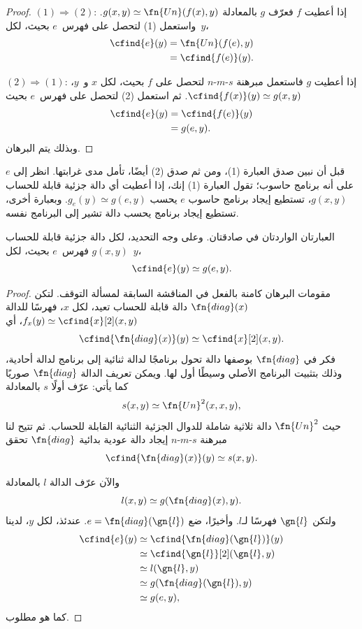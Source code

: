 \documentclass[../../../include/open-logic-section]{subfiles}
\begin{document}
\begin{proof}
$(1) \Rightarrow (2)$: إذا أعطيت $f$ فعرّف $g$ بالمعادلة
$g(x,y) \simeq \fn{Un}(f(x),y)$. واستعمل (1) لتحصل على فهرس~$e$
بحيث، لكل~$y$،
\begin{align*}
\cfind{e}(y) & = \fn{Un}(f(e),y) \\
& = \cfind{f(e)}(y).
\end{align*}

$(2) \Rightarrow (1)$: إذا أعطيت $g$ فاستعمل مبرهنة $s$-$m$-$n$
لتحصل على $f$ بحيث، لكل $x$ و~$y$،
$\cfind{f(x)}(y) \simeq g(x,y)$. ثم استعمل (2) لتحصل على فهرس~$e$
بحيث
\begin{align*}
\cfind{e}(y) & = \cfind{f(e)}(y) \\
& = g(e,y).
\end{align*}
وبذلك يتم البرهان.
\end{proof}

\begin{explain}
قبل أن نبين صدق العبارة (1)، ومن ثم صدق (2) أيضًا، تأمل مدى غرابتها.
انظر إلى $e$ على أنه برنامج حاسوب؛ تقول العبارة (1) إنك، إذا أعطيت
أي دالة جزئية قابلة للحساب $g(x,y)$، تستطيع إيجاد برنامج حاسوب $e$
يحسب $g_e(y) \simeq g(e,y)$. وبعبارة أخرى، تستطيع إيجاد برنامج يحسب
دالة تشير إلى البرنامج نفسه.
\end{explain}

\begin{thm}
العبارتان الواردتان في  صادقتان. وعلى وجه
التحديد، لكل دالة جزئية قابلة للحساب $g(x,y)$ فهرس~$e$ بحيث،
لكل~$y$،
\[
\cfind{e}(y) \simeq g(e,y).
\]
\end{thm}

\begin{proof}
مقومات البرهان كامنة بالفعل في المناقشة السابقة لمسألة التوقف. لتكن
$\fn{diag}(x)$ دالة قابلة للحساب تعيد، لكل $x$، فهرسًا للدالة
$f_x(y) \simeq \cfind{x}[2](x,y)$، أي
\[
\cfind{\fn{diag}(x)}(y) \simeq \cfind{x}[2](x,y).
\]
فكر في $\fn{diag}$ بوصفها دالة تحول برنامجًا لدالة ثنائية إلى برنامج
لدالة أحادية، وذلك بتثبيت البرنامج الأصلي وسيطًا أول لها. ويمكن تعريف
الدالة $\fn{diag}$ صوريًا كما يأتي: عرّف أولًا $s$ بالمعادلة
\[
s(x,y) \simeq \fn{Un}^2(x,x,y),
\]
حيث $\fn{Un}^2$ دالة ثلاثية شاملة للدوال الجزئية الثنائية القابلة
للحساب. ثم تتيح لنا مبرهنة $s$-$m$-$n$ إيجاد دالة عودية بدائية
$\fn{diag}$ تحقق
\[
\cfind{\fn{diag}(x)}(y) \simeq s(x,y).
\]

والآن عرّف الدالة $l$ بالمعادلة
\[
l(x,y) \simeq g(\fn{diag}(x),y).
\]
ولتكن $\gn{l}$ فهرسًا لـ$l$. وأخيرًا، ضع
$e=\fn{diag}(\gn{l})$. عندئذ، لكل $y$، لدينا
\begin{align*}
\cfind{e}(y) & \simeq \cfind{\fn{diag}(\gn{l})}(y) \\
& \simeq \cfind{\gn{l}}[2](\gn{l}, y) \\
& \simeq l(\gn{l}, y) \\
& \simeq g(\fn{diag}(\gn{l}),y) \\
& \simeq g(e, y),
\end{align*}
كما هو مطلوب.
\end{proof}
\end{document}
